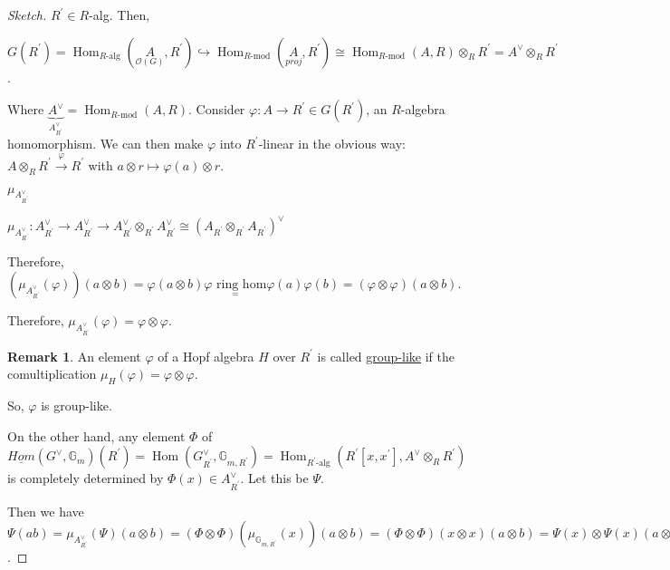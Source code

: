 \documentclass{article}
\theoremstyle{definition}
\numberwithin{theorem}{subsection}
\newtheorem*{remark}{Remark}
\begin{document}
    \begin{proof}
        [Sketch] \(R^{\prime} \in R\)-alg. Then,
        
        \(G(R^{\prime}) = \operatorname{Hom}_{R\text{-alg}}(\underset{\mathcal{O}(G)}{A},R^{\prime}) \hookrightarrow \operatorname{Hom}_{R\text{-mod}}(\underset{proj}{A},R^{\prime}) \cong \operatorname{Hom}_{R\text{-mod}}(A,R) \otimes_R R^{\prime} = A^\vee \otimes_R R^{\prime}\).

        Where \(\underbrace{A^\vee}_{A^\vee_{R^{\prime}}} = \operatorname{Hom}_{R\text{-mod}}(A,R)\). Consider \(\varphi : A \to R^{\prime} \in G(R^{\prime})\), an \(R\)-algebra homomorphism. We can then make \(\varphi\) into \(R^{\prime}\)-linear in the obvious way: \(A \otimes_R R^{\prime} \xrightarrow{\varphi}R^{\prime}\) with \(a \otimes r \mapsto \varphi(a) \otimes r\). 

        \(\mu_{A^\vee_{R^{\prime}}}\) 

        \(\mu_{A^\vee_{R^{\prime}}}: A^\vee_{R^{\prime}} \to A^\vee_{R^{\prime}} \to A^\vee_{R^{\prime}} \otimes_{R^{\prime}} A^\vee_{R^{\prime}} \cong (A_{R^{\prime}} \otimes_{R^{\prime}} A_{R^{\prime}})^\vee\) 

        Therefore, \((\mu_{A^\vee_{R^{\prime}}}(\varphi))(a \otimes b) = \varphi(a \otimes b) \underset{=}{\varphi \text{ ring hom}}  \varphi (a) \varphi(b) = (\varphi \otimes \varphi)(a \otimes b)\).

        Therefore, \(\mu_{A^\vee_{R^{\prime}}}(\varphi) = \varphi \otimes \varphi\).

        \begin{remark}
            An element \(\varphi\) of a Hopf algebra \(H\) over \(R^{\prime}\) is called \underline{group-like} if the comultiplication \(\mu_H(\varphi) = \varphi \otimes \varphi\).
        \end{remark}

        So, \(\varphi\) is group-like.

        On the other hand, any element \(\Phi\) of \(\underline{Hom}(G^\vee, \mathbb{G}_m)(R^{\prime}) = \operatorname{Hom}(G_{R^{\prime}}^\vee, \mathbb{G}_{m,R^{\prime}}) = \operatorname{Hom}_{R^{\prime}\text{-alg}}(R^{\prime}[x,x^{\prime}], A^\vee \otimes_R R^{\prime})\) is completely determined by \(\Phi(x) \in A^\vee_{R^{\prime}}\). Let this be \(\Psi\).
        
        Then we have \(\Psi(ab) = \mu_{A^\vee_{R^{\prime}}}(\Psi)(a \otimes b) = (\Phi \otimes \Phi)(\mu_{\mathbb{G}_{m,R^{\prime}}}(x))(a \otimes b) = (\Phi \otimes \Phi)(x \otimes x)(a \otimes b) = \Psi(x) \otimes \Psi(x)(a \otimes b) = \Psi(a) \Psi(b)\).


\end{proof}
\end{document}
